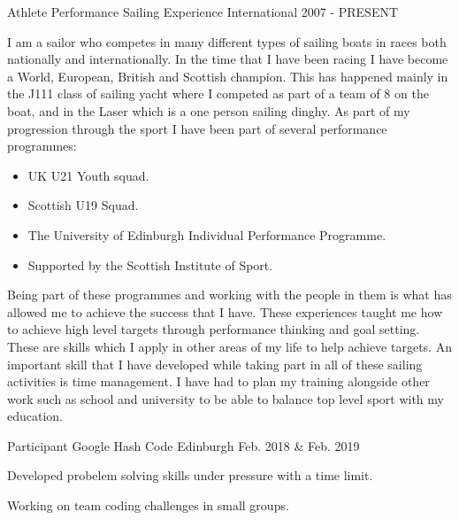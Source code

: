 

\begin{cventries}

  \cventry
    {Athlete} %
    {Performance Sailing Experience} %
    {International} %
    {2007 - PRESENT} %
    {
      I am a sailor who competes in many different types of sailing boats in races both nationally and internationally. In the time that I have been racing I have become a World, European, British and Scottish champion. This has happened mainly in the J111 class of sailing yacht where I competed as part of a team of 8 on the boat, and in the Laser which is a one person sailing dinghy. As part of my progression through the sport I have been part of several performance programmes:
      \begin{itemize}
          \item UK U21 Youth squad.
          \item Scottish U19 Squad.
          \item The University of Edinburgh Individual Performance Programme.
          \item Supported by the Scottish Institute of Sport.
      \end{itemize}
      Being part of these programmes and working with the people in them is what has allowed me to achieve the success that I have. These experiences taught me how to achieve high level targets through performance thinking and goal setting. These are skills which I apply in other areas of my life to help achieve targets. An important skill that I have developed while taking part in all of these sailing activities is time management. I have had to plan my training alongside other work such as school and university to be able to balance top level sport with my education.
    }

  \cventry
    {Participant} %
    {Google Hash Code} %
    {Edinburgh} %
    {Feb. 2018 \& Feb. 2019} %
    {
      \begin{cvitems} %
        \item {Developed probelem solving skills under pressure with a time limit.}
        \item {Working on team coding challenges in small groups.}
      \end{cvitems}
    }


\end{cventries}
